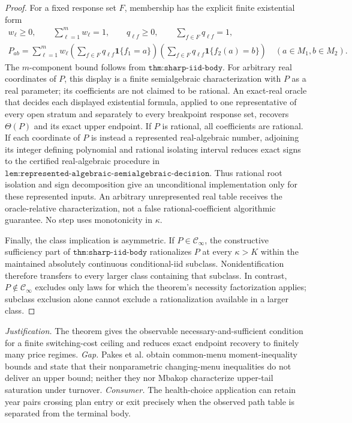 \documentclass{article}
\begin{document}
\begin{proof}
For a fixed response set \(F\), membership has the explicit finite existential form
\[
 \begin{gathered}
 w_\ell\ge0,\qquad \sum_{\ell=1}^{m}w_\ell=1,
 \qquad
 q_{\ell f}\ge0,\qquad \sum_{f\in F}q_{\ell f}=1,\\
 P_{ab}=\sum_{\ell=1}^{m}w_\ell
 \left(\sum_{f\in F}q_{\ell f}\mathbf 1\{f_1=a\}\right)
 \left(\sum_{f\in F}q_{\ell f}\mathbf 1\{f_2(a)=b\}\right)
 \quad(a\in M_1,b\in M_2).
 \end{gathered}
\]
The \(m\)-component bound follows from \(\texttt{thm:sharp-iid-body}\).  For arbitrary real coordinates of \(P\), this display is a finite semialgebraic characterization with \(P\) as a real parameter; its coefficients are not claimed to be rational.  An exact-real oracle that decides each displayed existential formula, applied to one representative of every open stratum and separately to every breakpoint response set, recovers \(\Theta(P)\) and its exact upper endpoint.  If \(P\) is rational, all coefficients are rational.  If each coordinate of \(P\) is instead a represented real-algebraic number, adjoining its integer defining polynomial and rational isolating interval reduces exact signs to the certified real-algebraic procedure in \(\texttt{lem:represented-algebraic-semialgebraic-decision}\).  Thus rational root isolation and sign decomposition give an unconditional implementation only for these represented inputs.  An arbitrary unrepresented real table receives the oracle-relative characterization, not a false rational-coefficient algorithmic guarantee.  No step uses monotonicity in \(\kappa\).

Finally, the class implication is asymmetric.  If \(P\in\mathcal C_\infty\), the constructive sufficiency part of \(\texttt{thm:sharp-iid-body}\) rationalizes \(P\) at every \(\kappa>K\) within the maintained absolutely continuous conditional-iid subclass.  Nonidentification therefore transfers to every larger class containing that subclass.  In contrast, \(P\notin\mathcal C_\infty\) excludes only laws for which the theorem's necessity factorization applies; subclass exclusion alone cannot exclude a rationalization available in a larger class.
\end{proof}
\par\smallskip\noindent \textit{Justification.} The theorem gives the observable necessary-and-sufficient condition for a finite switching-cost ceiling and reduces exact endpoint recovery to finitely many price regimes. \textit{Gap.} Pakes et al. obtain common-menu moment-inequality bounds and state that their nonparametric changing-menu inequalities do not deliver an upper bound; neither they nor Mbakop characterize upper-tail saturation under turnover. \textit{Consumer.} The health-choice application can retain year pairs crossing plan entry or exit precisely when the observed path table is separated from the terminal body.
\end{document}
